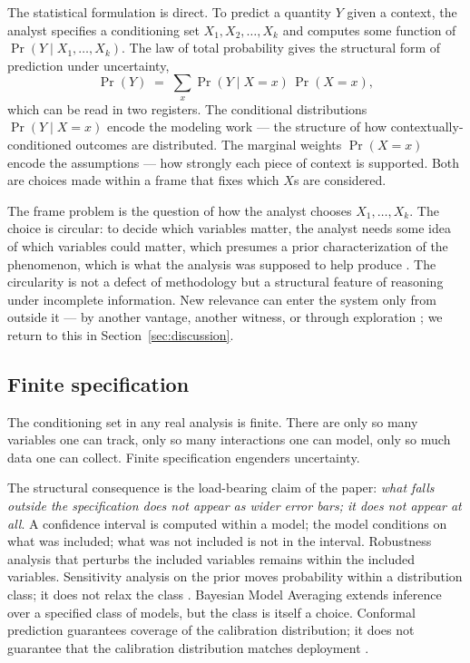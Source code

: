 \documentclass[11pt,a4paper]{article}
\begin{document}
The statistical formulation is direct. To predict a quantity $Y$ given a
context, the analyst specifies a conditioning set $X_1, X_2, \ldots, X_k$
and computes some function of $\Pr(Y \mid X_1, \ldots, X_k)$. The law of
total probability gives the structural form of prediction under
uncertainty,
%
\begin{equation}
\Pr(Y) \;=\; \sum_{x} \Pr(Y \mid X = x)\, \Pr(X = x),
\label{eq:total-prob}
\end{equation}
%
which can be read in two registers. The conditional distributions
$\Pr(Y \mid X = x)$ encode the modeling work --- the structure of how
contextually-conditioned outcomes are distributed. The marginal weights
$\Pr(X = x)$ encode the assumptions --- how strongly each piece of context
is supported. Both are choices made within a frame that fixes which $X$s
are considered.

The frame problem is the question of how the analyst chooses
$X_1, \ldots, X_k$. The choice is circular: to decide which variables
matter, the analyst needs some idea of which variables could matter, which
presumes a prior characterization of the phenomenon, which is what the
analysis was supposed to help produce \citep{Pylyshyn1987,Shanahan2016}.
The circularity is not a defect of methodology but a structural feature
of reasoning under incomplete information. New relevance can enter the
system only from outside it --- by another vantage, another witness, or
through exploration \citep{SuttonBarto2018}; we return to this in
Section~\ref{sec:discussion}.

\subsection{Finite specification}

The conditioning set in any real analysis is finite. There are only so
many variables one can track, only so many interactions one can model,
only so much data one can collect. Finite specification engenders
uncertainty.

The structural consequence is the load-bearing claim of the paper:
\emph{what falls outside the specification does not appear as wider error
bars; it does not appear at all}. A confidence interval is computed within
a model; the model conditions on what was included; what was not included
is not in the interval. Robustness analysis that perturbs the included
variables remains within the included variables. Sensitivity analysis on
the prior moves probability within a distribution class; it does not relax
the class \citep{Berger1985,Saltelli2008}. Bayesian Model Averaging
\citep{HoetingBMA1999} extends inference over a specified class of
models, but the class is itself a choice. Conformal prediction guarantees
coverage of the calibration distribution; it does not guarantee that the
calibration distribution matches deployment
\citep{Vovk2005,AngelopoulosBates2023}.
\end{document}
